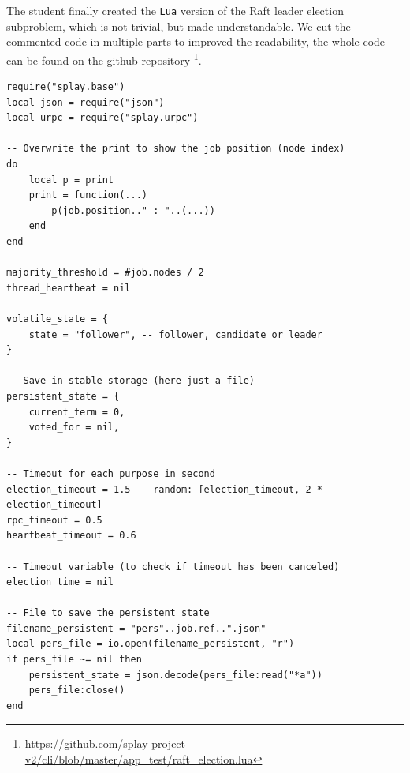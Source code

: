 \documentclass{eplmastersthesis}
\begin{document}
        The student finally created the \texttt{Lua} version of the Raft leader
        election subproblem, which is not trivial, but made
        understandable. We cut the commented code in multiple parts to improved the readability,
        the whole code can be found on the github repository
        \footnote{\url{https://github.com/splay-project-v2/cli/blob/master/app_test/raft_election.lua}}.

        \begin{minipage}{\linewidth}
        \begin{lstlisting}[style=MySmallLua,caption={Initialisation}]
require("splay.base")
local json = require("json")
local urpc = require("splay.urpc")

-- Overwrite the print to show the job position (node index)
do
	local p = print
	print = function(...)
		p(job.position.." : "..(...))
	end
end

majority_threshold = #job.nodes / 2
thread_heartbeat = nil

volatile_state = {
    state = "follower", -- follower, candidate or leader
}

-- Save in stable storage (here just a file)
persistent_state = {
    current_term = 0,
    voted_for = nil,
}

-- Timeout for each purpose in second
election_timeout = 1.5 -- random: [election_timeout, 2 * election_timeout]
rpc_timeout = 0.5
heartbeat_timeout = 0.6

-- Timeout variable (to check if timeout has been canceled)
election_time = nil

-- File to save the persistent state
filename_persistent = "pers"..job.ref..".json"
local pers_file = io.open(filename_persistent, "r")
if pers_file ~= nil then
    persistent_state = json.decode(pers_file:read("*a"))
    pers_file:close()
end
        \end{lstlisting}
        \end{minipage}
\end{document}
